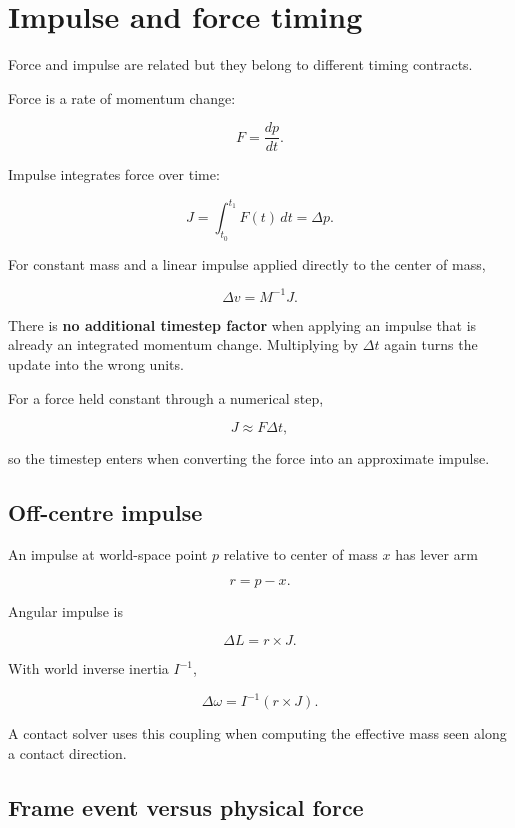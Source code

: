 \hypertarget{appendix-c39931e6e4c2}{}\label{referencestart:appendix-c39931e6e4c2}
\section{Impulse and force timing}\label{appendix-c39931e6e4c2-impulse-and-force-timing}

\hypertarget{appendix-c39931e6e4c2-impulse-and-force-timing}{}

Force and impulse are related but they belong to different timing contracts.

Force is a rate of momentum change:

\[
F=\frac{dp}{dt}.
\]

Impulse integrates force over time:

\[
J=\int_{t_0}^{t_1}F(t)\,dt
=
\Delta p.
\]

For constant mass and a linear impulse applied directly to the center of mass,

\[
\Delta v=M^{-1}J.
\]

There is \textbf{no additional timestep factor} when applying an impulse that is already an integrated momentum change. Multiplying by \(\Delta t\) again turns the update into the wrong units.

For a force held constant through a numerical step,

\[
J\approx F\Delta t,
\]

so the timestep enters when converting the force into an approximate impulse.

\subsection{Off-centre impulse}\label{appendix-c39931e6e4c2-off-centre-impulse}

\hypertarget{appendix-c39931e6e4c2-off-centre-impulse}{}

An impulse at world-space point \(p\) relative to center of mass \(x\) has lever arm

\[
r=p-x.
\]

Angular impulse is

\[
\Delta L=r\times J.
\]

With world inverse inertia \(I^{-1}\),

\[
\Delta\omega=I^{-1}(r\times J).
\]

A contact solver uses this coupling when computing the effective mass seen along a contact direction.

\subsection{Frame event versus physical force}\label{appendix-c39931e6e4c2-frame-event-versus-physical-force}

